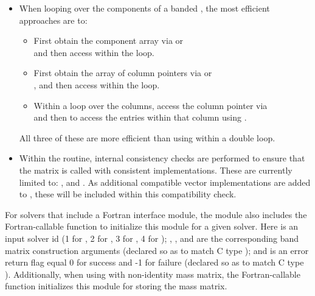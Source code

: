 \begin{itemize}
                                        
\item
  When looping over the components of a banded  ,
  the most efficient approaches are to:
  \begin{itemize}
    \item First obtain the component array via  or\\
     and then
    access  within the loop.
  
    \item First obtain the array of column pointers via  or\\
    , and then
    access  within the loop. 
  
    \item Within a loop over the columns, access the column pointer via\\
     and then to access the
    entries within that column using .
  \end{itemize}
  All three of these are more efficient than
  using  within a double loop.

\item
  {\warn} Within the  routine, internal
  consistency checks are performed to ensure that the matrix is called
  with consistent {\nvector} implementations.  These are currently
  limited to: {\nvecs}, {\nvecopenmp} and {\nvecpthreads}.  As additional
  compatible vector implementations are added to {\sundials}, these
  will be included within this compatibility check.

\end{itemize}

For solvers that include a Fortran interface module, the {\sunmatband}
module also includes the Fortran-callable
function  to initialize
this {\sunmatband} module for a given {\sundials} solver.
Here  is an input solver id (1 for {\cvode}, 2 for {\ida}, 3
for {\kinsol}, 4 for {\arkode}); , ,  and 
are the corresponding band matrix construction arguments (declared so
as to match C type ); and  is an error return flag
equal 0 for success and -1 for failure (declared so as to match C type
). Additionally, when using {\arkode} with non-identity mass
matrix, the Fortran-callable function  initializes this {\sunmatband} module for storing the
mass matrix.
